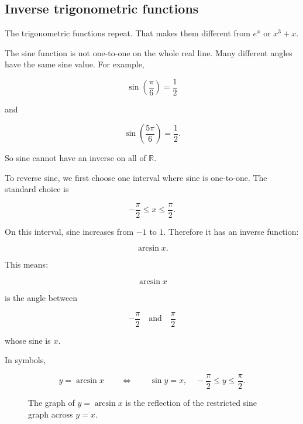 \subsection{Inverse trigonometric functions}
\label{subsec:inverse-trig-functions}

The trigonometric functions repeat.  That makes them different from \(e^x\) or \(x^3+x\).

The sine function is not one-to-one on the whole real line.  Many different angles have the same sine value.  For example,

\[
\sin\left(\frac{\pi}{6}\right)=\frac12
\]

and

\[
\sin\left(\frac{5\pi}{6}\right)=\frac12.
\]

So sine cannot have an inverse on all of \(\mathbb R\).

To reverse sine, we first choose one interval where sine is one-to-one.  The standard choice is

\[
-\frac{\pi}{2}\le x\le \frac{\pi}{2}.
\]

On this interval, sine increases from \(-1\) to \(1\).  Therefore it has an inverse function:

\[
\arcsin x.
\]

This means:

\[
\arcsin x
\]

is the angle between

\[
-\frac{\pi}{2}
\quad\text{and}\quad
\frac{\pi}{2}
\]

whose sine is \(x\).

In symbols,

\[
y=\arcsin x
\qquad\Longleftrightarrow\qquad
\sin y=x,
\quad
-\frac{\pi}{2}\le y\le\frac{\pi}{2}.
\]

\begin{figure}[h]
\centering
{}
\caption{The graph of \(y=\arcsin x\) is the reflection of the restricted sine graph across \(y=x\).}
\label{fig:arcsin-reflection}
\end{figure}


